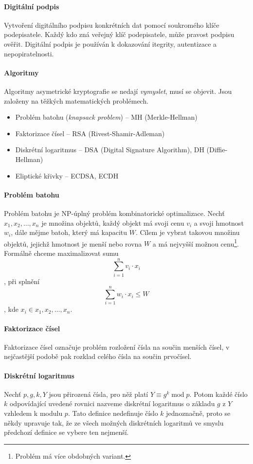 \paragraph*{Digitální podpis} Vytvoření digitálního podpisu konkrétních dat pomocí soukromého klíče podepisatele. Každý kdo zná veřejný klíč podepisatele, může pravost podpisu ověřit. Digitální podpis je používán k dokazování itegrity, autentizace a nepopiratelnosti.

\paragraph*{Algoritmy} Algoritmy asymetrické kryptografie se nedají \textit{vymyslet}, musí se objevit. Jsou založeny na těžkých matematických problémech. \begin{itemize}
    \item Problém batohu (\textit{knapsack problem}) -- MH (Merkle-Hellman)
    \item Faktorizace čísel -- RSA (Rivest-Shamir-Adleman)
    \item Diskrétní logaritmus -- DSA (Digital Signature Algorithm), DH (Diffie-Hellman)
    \item Eliptické křivky -- ECDSA, ECDH
\end{itemize}

\paragraph*{Problém batohu} Problém batohu je NP-úplný problém kombinatorické optimalizace. Nechť ${x_1, x_2, \dots, x_n}$ je množina objektů, každý objekt má svoji cenu $v_i$ a svoji hmotnost $w_i$, dále mějme batoh, který má kapacitu $W$. Cílem je vybrat takovou množinu objektů, jejichž hmotnost je menší nebo rovna $W$ a má nejvyšší možnou cenu\footnote{Problém má více obdobných variant.}. Formálně chceme maximalizovat sumu $$ \sum_{i=1}^n v_i \cdot x_i $$, při splnění $$ \sum_{i=1}^n w_i \cdot x_i \leq W $$, kde $x_i \in {x_1, x_2, \dots, x_n}$.

\paragraph*{Faktorizace čísel} Faktorizace čísel označuje problém rozložení čísla na součin menších čísel, v nejčastější podobě pak rozklad celého čísla na součin prvočísel.

\paragraph*{Diskrétní logaritmus} Nechť $p, g, k, Y$ jsou přirozená čísla, pro něž platí $Y \equiv g^{k} \; \text{mod} \; p$. Potom každé číslo $k$ odpovídající uvedené rovnici nazveme diskrétní logaritmus o základu $g$ z $Y$ vzhledem k modulu $p$. Tato definice nedefinuje číslo $k$ jednoznačně, proto se někdy upravuje tak, že ze všech možných diskrétních logaritmů ve smyslu předchozí definice se vybere ten nejmenší.

